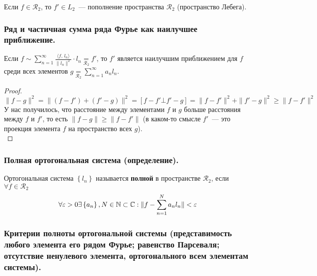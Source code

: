 Если $f \in \mathcal{R}_2$, то $f' \in L_2$~--- пополнение пространства $\mathcal{R}_2$ (пространство Лебега).

\subsubsection{Ряд и частичная сумма ряда Фурье как наилучшее приближение. \label{subsubsec:label3}}
\begin{theorem*}
    Если $f \sim \sum_{n=1}^\infty \frac{\langle f,\, l_n \rangle}{\| l_n \|^2} \cdot l_n \underset{\mathcal{R}_2}{=}f'$, то $f'$ является наилучшим приближением для $f$ среди всех элементов $g \underset{\mathcal{R}_2}{=} \sum_{n=1}^\infty a_n l_n$.    
\end{theorem*}
\begin{proof}
    \[\| f - g \|^2 = \| (f - f') + (f' - g) \|^2 = [f - f' \bot f' - g] = \| f - f' \|^2 + \| f' - g \|^2 \geq \| f - f' \|^2 \]
    У нас получилось, что расстояние между элементами $f$ и $g$ больше расстояния между $f$ и $f'$, то есть $\| f - g \| \geq \| f - f' \|$ (в каком-то смысле $f'$~--- это проекция элемента $f$ на пространство всех $g$).\\
\end{proof}

\subsubsection{Полная ортогональная система (определение).}
\begin{definition*}
    Ортогональная система $\left\{ l_n \right\}$ называется \textbf{полной} в пространстве $\mathcal{R}_2$, если $\forall f \in \mathcal{R}_2$
    \[\forall \varepsilon > 0 \exists \left\{ a_n \right\}, N \in \mathbb{N} \subset \mathbb{C}: \| f - \sum_{n=1}^N a_n l_n \| < \varepsilon\]        
\end{definition*}

\subsubsection{Критерии полноты ортогональной системы (представимость любого элемента его рядом Фурье; равенство Парсеваля; отсутствие ненулевого элемента, ортогонального всем элементам системы).}

